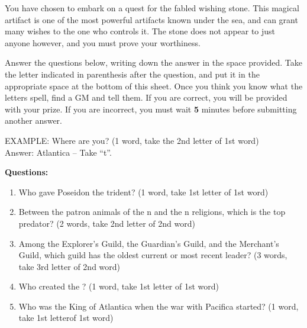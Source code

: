 \documentclass[green]{NeptuneBall}
\begin{document}
\name{\gWS{}}

You have chosen to embark on a quest for the fabled wishing stone. This magical artifact is one of the most powerful artifacts known under the sea, and can grant many wishes to the one who controls it. The stone does not appear to just anyone however, and you must prove your worthiness.

Answer the questions below, writing down the answer in the space provided. Take the letter indicated in parenthesis after the question, and put it in the appropriate space at the bottom of this sheet. Once you think you know what the letters spell, find a GM and tell them. If you are correct, you will be provided with your prize. If you are incorrect, you must wait {\bf 5} minutes before submitting another answer.

EXAMPLE:
Where are you? (1 word, take the 2nd letter of 1st word)\\
Answer: Atlantica  -- Take ``t''.
		

{\bf Questions:}
\begin{enumerate}
 \item Who gave Poseidon the trident? (1 word, take 1st letter of 1st word) \vspace{3 mm}\\  \underline{\hspace{15cm}}
 \item Between the patron animals of the \pPacifica{}n and the \pAtlantis{}n religions, which is the top predator? (2 words, take 2nd letter of 2nd word) \vspace{3 mm}\\ \underline{\hspace{15cm}}
	\item Among the Explorer's Guild, the Guardian's Guild, and the Merchant's Guild, which guild has the oldest current or most recent leader? (3 words, take 3rd letter of 2nd word) \vspace{3 mm}\\ \underline{\hspace{15cm}}
	\item Who created the \sArtifactTwo{}? (1 word, take 1st letter of 1st word) \vspace{3 mm}\\ \underline{\hspace{15cm}}
	\item Who was the King of Atlantica when the war with Pacifica started? (1 word, take 1st letterof 1st word) \vspace{3 mm}\\ \underline{\hspace{15cm}}
\end{enumerate}
\end{document}
